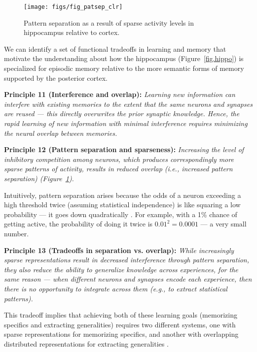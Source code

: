 \documentclass[11pt,twoside]{article}
\begin{document}
\begin{figure}
  \centering\texttt{[image: figs/fig\_patsep\_clr]}
  \caption{\small Pattern separation as a result of sparse activity levels in hippocampus relative to cortex.}
  \label{fig.patsep}
\end{figure}


We can identify a set of functional tradeoffs in learning and memory that motivate the understanding about how the hippocampus (Figure~\ref{fig.hippo}) is specialized for episodic memory relative to the more semantic forms of memory supported by the posterior cortex.

{\bf Principle 11 (Interference and overlap):} {\em Learning new information can interfere with existing memories to the extent that the same neurons and synapses are reused --- this directly overwrites the prior synaptic knowledge.  Hence, the rapid learning of new information with minimal interference requires minimizing the neural overlap between memories.}

{\bf Principle 12 (Pattern separation and sparseness):} {\em Increasing the level of inhibitory competition among neurons, which produces correspondingly more sparse patterns of activity, results in reduced overlap (i.e., increased pattern separation) (Figure~\ref{fig.patsep}).}

Intuitively, pattern separation arises because the odds of a neuron exceeding a high threshold twice (assuming statistical independence) is like squaring a low probability --- it goes down quadratically \cite{Marr71}.  For example, with a 1\% chance of getting active, the probability of doing it twice is $0.01^2 = 0.0001$ --- a very small number.

{\bf Principle 13 (Tradeoffs in separation vs. overlap):} {\em While increasingly sparse representations result in decreased interference through pattern separation, they also reduce the ability to generalize knowledge across experiences, for the same reason --- when different neurons and synapses encode each experience, then there is no opportunity to integrate across them (e.g., to extract statistical patterns).}

This tradeoff implies that achieving both of these learning goals (memorizing specifics and extracting generalities) requires two different systems, one with sparse representations for memorizing specifics, and another with overlapping distributed representations for extracting generalities \cite{McClellandMcNaughtonOReilly95,SherrySchacter87}.
\end{document}
